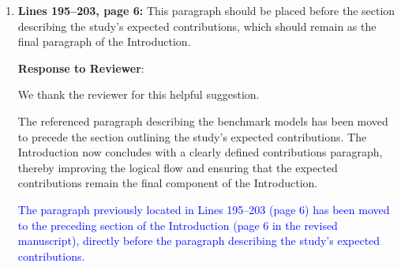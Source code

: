 \documentclass[12pt,letterpaper]{article}
\begin{document}
\begin{enumerate}
\begin{itemize}
\item \textcolor{red}{\textbf{Comprehensive and Statistically Rigorous Evaluation:} A rigorous evaluation of the proposed model against state-of-the-art segmentation networks. This study establishes the effectiveness of lightweight architectures through extensive statistical analysis and demonstrated that high segmentation accuracy and cross-sectional area (CSA) estimation can be achieved with significantly reduced parameter counts.}

\item \textcolor{red}{\textbf{Clinical Translation through Real-Time Integration:} Development and deployment of an end-to-end clinical workflow that integrates the deep learning model with real-time ultrasound data. This contribution includes a custom graphical interface for real-time visualization and automatic CSA computation, validated on a diverse dataset of healthy subjects and patients with carpal tunnel syndrome (CTS) to assess clinical feasibility.}



\end{itemize}










    
    \item \textbf{Lines 195--203, page 6:} This paragraph should be placed before the section describing the study's expected contributions, which should remain as the final paragraph of the Introduction.



    \textbf{Response to Reviewer}:


We thank the reviewer for this helpful suggestion. 

The referenced paragraph describing the benchmark models has been moved to precede the section outlining the study’s expected contributions. 
The Introduction now concludes with a clearly defined contributions paragraph, thereby improving the logical flow and ensuring that the expected contributions remain the final component of the Introduction.


\textcolor{blue}{The paragraph previously located in Lines 195--203 (page 6) has been moved to the preceding section of the Introduction (page 6 in the revised manuscript), directly before the paragraph describing the study’s expected contributions. }

\end{enumerate}
\end{document}
